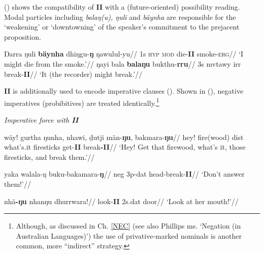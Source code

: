 () shows the compatibility of \textbf{II} with a (future-oriented) possibility reading. Modal particles including \textit{balaŋ(u), ŋuli} and \textit{bäynha} are responsible for the `weakening' or `downtowning' of the speaker's commitment to the prejacent proposition. 

\pex\a{}\begingl\gla Ŋarra ŋuli \textbf{bäynha} dhiŋgu-\textbf{ŋ} ŋawulul-yu//
\glb 1s \textsc{hyp} \textsc{mod} die-\textbf{II} smoke-\textsc{erg}//
\glft`I might die from the smoke.'//\endgl
\a\begingl\gla ŋayi bala \textbf{balaŋu} bukthu-\textbf{rru}//
\glb 3s \gls{mvtawy} \gls{irr} break-\textbf{II}//
\glft`It (the recorder) might break.'\trailingcitation{[DG~20190417]}//\endgl
\xe



\textbf{II} is additionally used to encode imperative clauses (). Shown in (), negative imperatives (probibitives) are treated identically.\footnote{Although, as discussed in Ch. \ref{NEC} (see also Phillips ms. `Negation (in Australian Languages)') the use of privative-marked nominals is another common, more ``indirect'' strategy.}

\pex\textit{Imperative force with \textbf{II}}

\a\begingl\gla wäy! gurtha ŋunha, nhawi, ḏutji män-\textbf{ŋu}, bakmara-\textbf{ŋu}//
\glb hey! fire(wood) \gls{dist} what's.it firesticks get-\textbf{II} break\textbf{-II}//
\glft`Hey! Get that firewood, what's it, those firesticks, and break them.'//\endgl

\a{}\begingl\gla yaka walala-ŋ buku-bakamara-\textbf{ŋ}//
\glb \gls{neg} 3p-\gls{dat} head-break-\textbf{II}//
\glft `Don't answer them!'//\endgl


\a\begingl\gla nhä\textbf{-ŋu} nhanŋu dhurrwara!//
\glb look-\textbf{II} 2s.\gls{dat} door//
\glft`Look at her mouth!'\trailingcitation[AW 20180731]//\endgl

